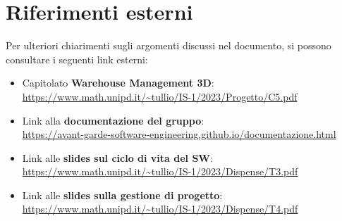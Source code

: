 \section{Riferimenti esterni}\label{sec:riferimenti_esterni}
Per ulteriori chiarimenti sugli argomenti discussi nel documento, si possono consultare i seguenti link esterni:
\begin{itemize}
    \item Capitolato \textbf{Warehouse Management 3D}:\\
    \url{https://www.math.unipd.it/~tullio/IS-1/2023/Progetto/C5.pdf}
    \item Link alla \textbf{documentazione del gruppo}:\\
    \url{https://avant-garde-software-engineering.github.io/documentazione.html}
    \item Link alle \textbf{slides sul ciclo di vita del SW}:\\
    \url{https://www.math.unipd.it/~tullio/IS-1/2023/Dispense/T3.pdf}
    \item Link alle \textbf{slides sulla gestione di progetto}:\\
    \url{https://www.math.unipd.it/~tullio/IS-1/2023/Dispense/T4.pdf}   
\end{itemize}
